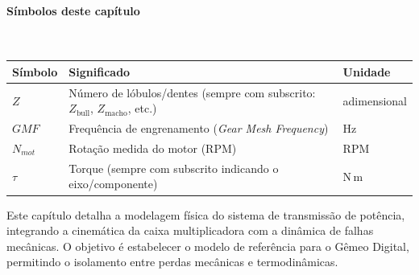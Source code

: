 \documentclass[12pt,a4paper]{article}
\numberwithin{equation}{section}
\numberwithin{table}{section}
\numberwithin{figure}{section}
\begin{document}
{\paragraph{Símbolos deste capítulo}\mbox{}\\[-0.5em]
{\small
\begin{longtable}{>{\raggedright\arraybackslash}p{2.6cm} >{\raggedright\arraybackslash}p{9.2cm} >{\raggedright\arraybackslash}p{2.6cm}}
	\toprule
	\textbf{Símbolo} & \textbf{Significado} & \textbf{Unidade} \\ \midrule
	\endhead
	$Z$ & Número de lóbulos/dentes (sempre com subscrito: $Z_{\text{bull}}$, $Z_{\text{macho}}$, etc.) & adimensional \\
	$GMF$ & Frequência de engrenamento (\textit{Gear Mesh Frequency}) & Hz \\
	$N_{mot}$\dag & Rotação medida do motor (RPM) & RPM \\
	$\tau$ & Torque (sempre com subscrito indicando o eixo/componente) & N\,m \\
	\bottomrule
\end{longtable}
}




	
	Este capítulo detalha a modelagem física do sistema de transmissão de potência, integrando a cinemática da caixa multiplicadora com a dinâmica de falhas mecânicas. O objetivo é estabelecer o modelo de referência para o Gêmeo Digital, permitindo o isolamento entre perdas mecânicas e termodinâmicas.
	
}
\end{document}
